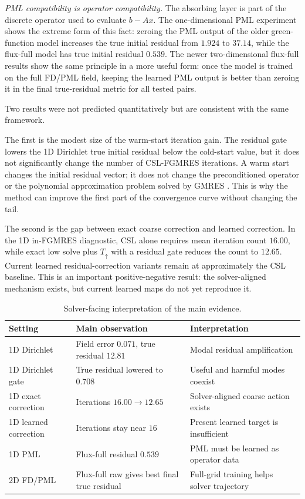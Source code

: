 \textit{PML compatibility is operator compatibility.} The absorbing layer is
part of the discrete operator used to evaluate $b-Ax$. The one-dimensional PML
experiment shows the extreme form of this fact: zeroing the PML output of the
older green-function model increases the true initial residual from $1.924$ to
$37.14$, while the flux-full model has true initial residual $0.539$. The newer
two-dimensional flux-full results show the same principle in a more useful
form: once the model is trained on the full FD/PML field, keeping the learned
PML output is better than zeroing it in the final true-residual metric for all
tested pairs.

Two results were not predicted quantitatively but are consistent with the same
framework.

The first is the modest size of the warm-start iteration gain. The residual
gate lowers the 1D Dirichlet true initial residual below the cold-start value,
but it does not significantly change the number of CSL-FGMRES iterations. A
warm start changes the initial residual vector; it does not change the
preconditioned operator or the polynomial approximation problem solved by
GMRES \cite{Saad2003}. This is why the method can improve the first part
of the convergence curve without changing the tail.

The second is the gap between exact coarse correction and learned correction.
In the 1D in-FGMRES diagnostic, CSL alone requires mean iteration count
$16.00$, while exact low solve plus $T_\uparrow$ with a residual gate reduces
the count to $12.65$. Current learned residual-correction variants remain at
approximately the CSL baseline. This is an important positive-negative result:
the solver-aligned mechanism exists, but current learned maps do not yet
reproduce it.

\begin{table}[htbp]
\centering
\caption{Solver-facing interpretation of the main evidence.}
\label{tab:discussion-evidence-map}
\begin{tabular}{lll}
\toprule
Setting & Main observation & Interpretation \\
\midrule
1D Dirichlet & Field error $0.071$, true residual $12.81$ & Modal residual amplification \\
1D Dirichlet gate & True residual lowered to $0.708$ & Useful and harmful modes coexist \\
1D exact correction & Iterations $16.00\to12.65$ & Solver-aligned coarse action exists \\
1D learned correction & Iterations stay near $16$ & Present learned target is insufficient \\
1D PML & Flux-full residual $0.539$ & PML must be learned as operator data \\
2D FD/PML & Flux-full raw gives best final true residual & Full-grid training helps solver trajectory \\
\bottomrule
\end{tabular}
\end{table}

